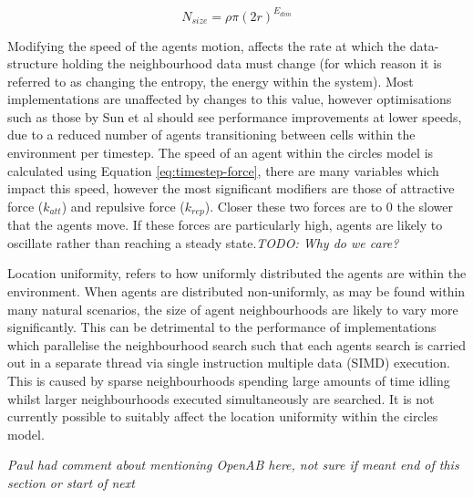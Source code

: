     \begin{equation}\label{eq:neighbourhood-size}
        N_{size} = \rho \pi (2r)^{E_{dim}}
    \end{equation}
      
    Modifying the speed of the agents motion, affects the rate at which the data-structure holding the neighbourhood data must change (for which reason it is referred to as changing the entropy, the energy within the system). Most implementations are unaffected by changes to this value, however optimisations such as those by Sun et al\cite{HY*15} should see performance improvements at lower speeds, due to a reduced number of agents transitioning between cells within the environment per timestep. The speed of an agent within the circles model is calculated using Equation \ref{eq:timestep-force}, there are many variables which impact this speed, however the most significant modifiers are those of attractive force ($k_{att}$) and repulsive force ($k_{rep}$). Closer these two forces are to $0$ the slower that the agents move. If these forces are particularly high, agents are likely to oscillate rather than reaching a steady state.\textit{TODO: Why do we care?}
    
    Location uniformity, refers to how uniformly distributed the agents are within the environment. When agents are distributed non-uniformly, as may be found within many natural scenarios, the size of agent neighbourhoods are likely to vary more significantly. This can be detrimental to the performance of implementations which parallelise the neighbourhood search such that each agents search is carried out in a separate thread via single instruction multiple data (SIMD) execution. This is caused by sparse neighbourhoods spending large amounts of time idling whilst larger neighbourhoods executed simultaneously are searched. It is not currently possible to suitably affect the location uniformity within the circles model.
    
    \textit{Paul had comment about mentioning OpenAB here, not sure if meant end of this section or start of next}
